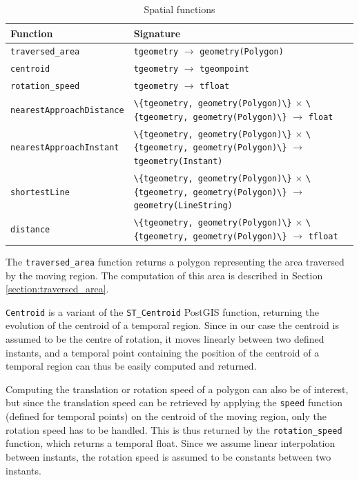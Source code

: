 \begin{table}[h!]
    \centering
    \begin{tabularx}{\textwidth}{|l|X|}
    \hline
    \textbf{Function}   & \textbf{Signature} \\ 
    \hline
    \lstinline+traversed_area+      & \lstinline+tgeometry+ $\rightarrow$ \lstinline+geometry(Polygon)+\\
    \hline
    \lstinline+centroid+            & \lstinline+tgeometry+ $\rightarrow$ \lstinline+tgeompoint+\\
    \hline
    \lstinline+rotation_speed+      & \lstinline+tgeometry+ $\rightarrow$ \lstinline+tfloat+ \\
    \hline
    \lstinline+nearestApproachDistance+ & \lstinline+\{tgeometry, geometry(Polygon)\}+ $\times$ \lstinline+\{tgeometry, geometry(Polygon)\}+ $\rightarrow$ \lstinline+float+ \\
    \hline
    \lstinline+nearestApproachInstant+  & \lstinline+\{tgeometry, geometry(Polygon)\}+ $\times$ \lstinline+\{tgeometry, geometry(Polygon)\}+ $\rightarrow$ \lstinline+tgeometry(Instant)+ \\
    \hline
    \lstinline+shortestLine+         & \lstinline+\{tgeometry, geometry(Polygon)\}+ $\times$ \lstinline+\{tgeometry, geometry(Polygon)\}+ $\rightarrow$ \lstinline+geometry(LineString)+ \\
    \hline
    \lstinline+distance+         & \lstinline+\{tgeometry, geometry(Polygon)\}+ $\times$ \lstinline+\{tgeometry, geometry(Polygon)\}+ $\rightarrow$ \lstinline+tfloat+ \\
    \hline
    \end{tabularx}
    \caption{Spatial functions}
    \label{table:spatial_funcs}
\end{table}

The \lstinline{traversed_area} function returns a polygon representing the area traversed by the moving region. The computation of this area is described in Section \ref{section:traversed_area}.

\lstinline{Centroid} is a variant of the \lstinline{ST_Centroid} PostGIS function, returning the evolution of the centroid of a temporal region. Since in our case the centroid is assumed to be the centre of rotation, it moves linearly between two defined instants, and a temporal point containing the position of the centroid of a temporal region can thus be easily computed and returned.

Computing the translation or rotation speed of a polygon can also be of interest, but since the translation speed can be retrieved by applying the \lstinline{speed} function (defined for temporal points) on the centroid of the moving region, only the rotation speed has to be handled. This is thus returned by the \lstinline{rotation_speed} function, which returns a temporal float. Since we assume linear interpolation between instants, the rotation speed is assumed to be constants between two instants.

